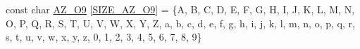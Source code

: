 \begin{DoxyCompactItemize}
const char \hyperlink{namespacebe_1_1esi_1_1secl_1_1pn_a4c23196d41006571c781f0f6ca84e10a}{A\+Z\+\_\+\+O9} \mbox{[}\hyperlink{namespacebe_1_1esi_1_1secl_1_1pn_a1ec87af9e9dbcae67e1e5974e7b96dde}{S\+I\+Z\+E\+\_\+\+A\+Z\+\_\+\+O9}\mbox{]} = \{\textquotesingle{}A\textquotesingle{}, \textquotesingle{}B\textquotesingle{}, \textquotesingle{}C\textquotesingle{}, \textquotesingle{}D\textquotesingle{}, \textquotesingle{}E\textquotesingle{}, \textquotesingle{}F\textquotesingle{}, \textquotesingle{}G\textquotesingle{}, \textquotesingle{}H\textquotesingle{}, \textquotesingle{}I\textquotesingle{}, \textquotesingle{}J\textquotesingle{}, \textquotesingle{}K\textquotesingle{}, \textquotesingle{}L\textquotesingle{}, \textquotesingle{}M\textquotesingle{}, \textquotesingle{}N\textquotesingle{}, \textquotesingle{}O\textquotesingle{}, \textquotesingle{}P\textquotesingle{}, \textquotesingle{}Q\textquotesingle{}, \textquotesingle{}R\textquotesingle{}, \textquotesingle{}S\textquotesingle{}, \textquotesingle{}T\textquotesingle{}, \textquotesingle{}U\textquotesingle{}, \textquotesingle{}V\textquotesingle{}, \textquotesingle{}W\textquotesingle{}, \textquotesingle{}X\textquotesingle{}, \textquotesingle{}Y\textquotesingle{}, \textquotesingle{}Z\textquotesingle{}, \textquotesingle{}a\textquotesingle{}, \textquotesingle{}b\textquotesingle{}, \textquotesingle{}c\textquotesingle{}, \textquotesingle{}d\textquotesingle{}, \textquotesingle{}e\textquotesingle{}, \textquotesingle{}f\textquotesingle{}, \textquotesingle{}g\textquotesingle{}, \textquotesingle{}h\textquotesingle{}, \textquotesingle{}i\textquotesingle{}, \textquotesingle{}j\textquotesingle{}, \textquotesingle{}k\textquotesingle{}, \textquotesingle{}l\textquotesingle{}, \textquotesingle{}m\textquotesingle{}, \textquotesingle{}n\textquotesingle{}, \textquotesingle{}o\textquotesingle{}, \textquotesingle{}p\textquotesingle{}, \textquotesingle{}q\textquotesingle{}, \textquotesingle{}r\textquotesingle{}, \textquotesingle{}s\textquotesingle{}, \textquotesingle{}t\textquotesingle{}, \textquotesingle{}u\textquotesingle{}, \textquotesingle{}v\textquotesingle{}, \textquotesingle{}w\textquotesingle{}, \textquotesingle{}x\textquotesingle{}, \textquotesingle{}y\textquotesingle{}, \textquotesingle{}z\textquotesingle{}, \textquotesingle{}0\textquotesingle{}, \textquotesingle{}1\textquotesingle{}, \textquotesingle{}2\textquotesingle{}, \textquotesingle{}3\textquotesingle{}, \textquotesingle{}4\textquotesingle{}, \textquotesingle{}5\textquotesingle{}, \textquotesingle{}6\textquotesingle{}, \textquotesingle{}7\textquotesingle{}, \textquotesingle{}8\textquotesingle{}, \textquotesingle{}9\textquotesingle{}\}

\end{DoxyCompactItemize}
